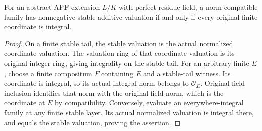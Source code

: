 \begin{lemma}
\label{fw:norm-limit-integrality}
\leanok
For an abstract APF extension $L/K$ with perfect residue field,
a norm-compatible family has nonnegative stable additive valuation
if and only if every original finite coordinate is integral.
\end{lemma}
\begin{proof}
On a finite stable tail, the stable valuation is the actual normalized
coordinate valuation. The valuation ring of that coordinate valuation
is its original integer ring, giving integrality on the stable tail.
For an arbitrary finite $E$, choose a finite compositum $F$ containing
$E$ and a stable-tail witness. Its coordinate is integral, so its
actual integral norm belongs to $\mathcal O_E$.
Original-field inclusion identifies that norm with the original field
norm, which is the coordinate at $E$ by compatibility.
Conversely, evaluate an everywhere-integral family at any finite
stable layer. Its actual normalized valuation is integral there,
and equals the stable valuation, proving the assertion.
\end{proof}

